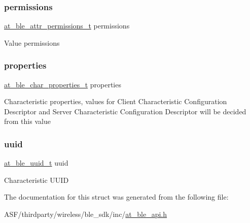 \subsubsection{\texorpdfstring{permissions}{permissions}}
{\footnotesize\ttfamily \mbox{\hyperlink{at__ble__api_8h_a5d87cd231ea3f9e11846dba7cf75eb61}{at\+\_\+ble\+\_\+attr\+\_\+permissions\+\_\+t}} permissions}

Value permissions \mbox{\label{structat__ble__char__val__t_a0dafa6fd00ebd001cb8b6655e9806ed0}} 
\subsubsection{\texorpdfstring{properties}{properties}}
{\footnotesize\ttfamily \mbox{\hyperlink{at__ble__api_8h_a5f124b442695fa38f139ebe48167698d}{at\+\_\+ble\+\_\+char\+\_\+properties\+\_\+t}} properties}

Characteristic properties, values for Client Characteristic Configuration Descriptor and Server Characteristic Configuration Descriptor will be decided from this value \mbox{\label{structat__ble__char__val__t_a679a8e56540040619aee07eb7a743859}} 
\subsubsection{\texorpdfstring{uuid}{uuid}}
{\footnotesize\ttfamily \mbox{\hyperlink{structat__ble__uuid__t}{at\+\_\+ble\+\_\+uuid\+\_\+t}} uuid}

Characteristic U\+U\+ID 

The documentation for this struct was generated from the following file\+:\begin{DoxyCompactItemize}
\item 
A\+S\+F/thirdparty/wireless/ble\+\_\+sdk/inc/\mbox{\hyperlink{at__ble__api_8h}{at\+\_\+ble\+\_\+api.\+h}}\end{DoxyCompactItemize}
